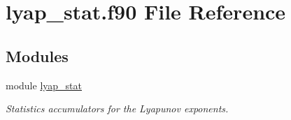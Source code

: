 \hypertarget{lyap__stat_8f90}{}\section{lyap\+\_\+stat.\+f90 File Reference}
\label{lyap__stat_8f90}
\subsection*{Modules}
\begin{DoxyCompactItemize}
\item 
module \hyperlink{namespacelyap__stat}{lyap\+\_\+stat}
\begin{DoxyCompactList}\small\item\em Statistics accumulators for the Lyapunov exponents. \end{DoxyCompactList}\end{DoxyCompactItemize}

